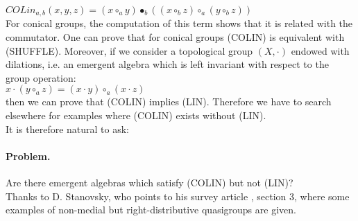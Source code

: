 \documentclass{article}
\begin{document}
$COLin_{a,b}(x,y,z) =  (x \circ_{a} y) \bullet_{b} ((x \circ_{b} z) \circ_{a} (y \circ_{b} z))$ \\

For conical groups, the computation of this term shows that it is related with the commutator.  One can prove that for conical groups (COLIN) is equivalent with (SHUFFLE). Moreover, if we consider a topological group $(X,\cdot)$ endowed with dilations, i.e. an emergent algebra which is left invariant with respect to the group operation: \\

$x \cdot (y \circ_{a} z) = (x \cdot y) \circ_{a} (x \cdot z)$ \\

\noindent then we can prove that (COLIN) implies (LIN). Therefore we have to search elsewhere for examples where (COLIN) exists without (LIN).\\


It is therefore natural to ask: 

\paragraph{Problem.} Are there emergent algebras which satisfy (COLIN) but not (LIN)? \\ 


Thanks to D. Stanovsky, who points to his survey article \cite{stanovsky}, section 3, where some examples of non-medial but right-distributive quasigroups are given. 
\end{document}
